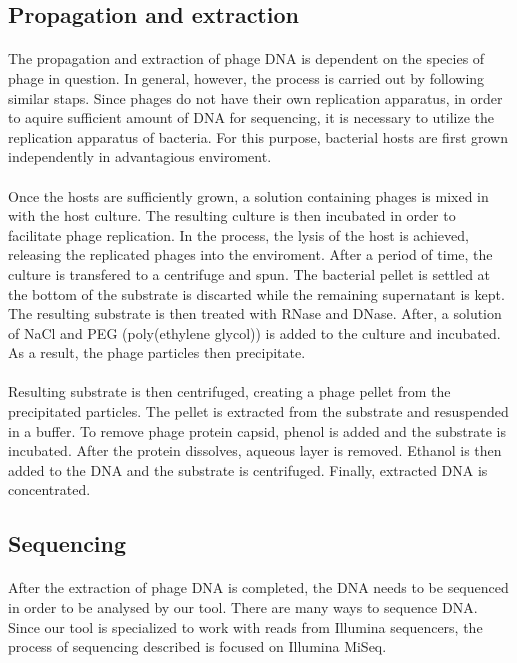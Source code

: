\subsection{Propagation and extraction}
\paragraph*{}
The propagation and extraction of phage DNA is dependent on the species of phage in question. In general, however, the process is carried out by following similar staps. Since phages do not have their own replication apparatus, in order to aquire sufficient amount of DNA for sequencing, it is necessary to utilize the replication apparatus of bacteria. For this purpose, bacterial hosts are first grown independently in advantagious enviroment.
\paragraph*{}
Once the hosts are sufficiently grown, a solution containing phages is mixed in with the host culture. The resulting culture is then incubated in order to facilitate phage replication. In the process, the lysis of the host is achieved, releasing the replicated phages into the enviroment. After a period of time, the culture is transfered to a centrifuge and spun. The bacterial pellet is settled at the bottom of the substrate is discarted while the remaining supernatant is kept. The resulting substrate is then treated with RNase and DNase. After, a solution of NaCl and PEG (poly(ethylene glycol)) is added to the culture and incubated. As a result, the phage particles then precipitate. 
\paragraph*{}
Resulting substrate is then centrifuged, creating a phage pellet from the precipitated particles. The pellet is extracted from the substrate and resuspended in a buffer. To remove phage protein capsid, phenol is added and the substrate is incubated. After the protein dissolves, aqueous layer is removed. Ethanol is then added to the DNA and the substrate is centrifuged. Finally, extracted DNA is concentrated.

\subsection{Sequencing}
\paragraph*{}
After the extraction of phage DNA is completed, the DNA needs to be sequenced in order to be analysed by our tool. There are many ways to sequence DNA. Since our tool is specialized to work with reads from Illumina sequencers, the process of sequencing described is focused on Illumina MiSeq.
